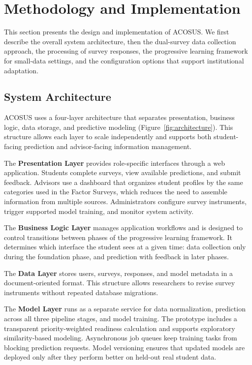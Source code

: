 \documentclass[letterpaper,11pt]{article}
\begin{document}
\section{Methodology and Implementation}\label{sec:methodology}

This section presents the design and implementation of ACOSUS. We first describe the overall system architecture, then the dual-survey data collection approach, the processing of survey responses, the progressive learning framework for small-data settings, and the configuration options that support institutional adaptation.

\subsection{System Architecture}\label{subsec:sysarch}

ACOSUS uses a four-layer architecture that separates presentation, business logic, data storage, and predictive modeling (Figure~\ref{fig:architecture}). This structure allows each layer to scale independently and supports both student-facing prediction and advisor-facing information management.

The \textbf{Presentation Layer} provides role-specific interfaces through a web application. Students complete surveys, view available predictions, and submit feedback. Advisors use a dashboard that organizes student profiles by the same categories used in the Factor Surveys, which reduces the need to assemble information from multiple sources. Administrators configure survey instruments, trigger supported model training, and monitor system activity.

The \textbf{Business Logic Layer} manages application workflows and is designed to control transitions between phases of the progressive learning framework. It determines which interface the student sees at a given time: data collection only during the foundation phase, and prediction with feedback in later phases.

The \textbf{Data Layer} stores users, surveys, responses, and model metadata in a document-oriented format. This structure allows researchers to revise survey instruments without repeated database migrations.

The \textbf{Model Layer} runs as a separate service for data normalization, prediction across all three pipeline stages, and model training. The prototype includes a transparent priority-weighted readiness calculation and supports exploratory similarity-based modeling. Asynchronous job queues keep training tasks from blocking prediction requests. Model versioning ensures that updated models are deployed only after they perform better on held-out real student data.
\end{document}

